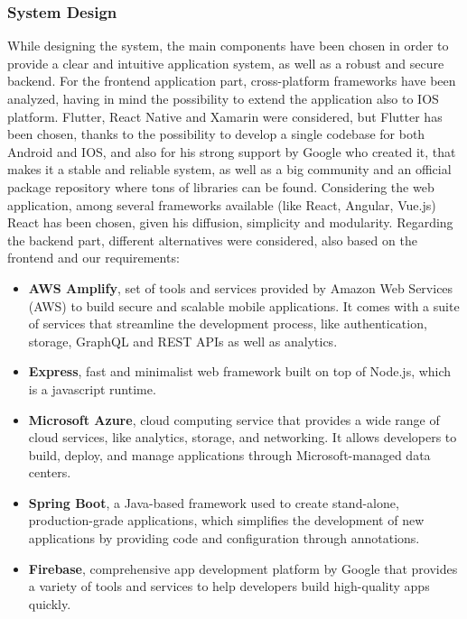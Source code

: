 \subsubsection{System Design}

While designing the system, the main components have been chosen in order to provide a clear and intuitive application system, as well as a robust and secure backend.
\newline For the frontend application part, cross-platform frameworks have been analyzed, having in mind the possibility to extend the application also to IOS platform. Flutter, React Native and Xamarin were considered, but Flutter has been chosen, thanks to the possibility to develop a single codebase for both Android and IOS, and also for his strong support by Google who created it, that makes it a stable and reliable system, as well as a big community and an official package repository where tons of libraries can be found. Considering the web application, among several frameworks available (like React, Angular, Vue.js) React has been chosen, given his diffusion, simplicity and modularity.   
\newline Regarding the backend part, different alternatives were considered, also based on the frontend and our requirements:
\begin{itemize}[nosep] %
    \item \textbf{AWS Amplify}, set of tools and services provided by Amazon Web Services (AWS) to build secure and scalable mobile applications. It comes with a suite of services that streamline the development process, like authentication, storage, GraphQL and REST APIs as well as analytics. 
    \item \textbf{Express}, fast and minimalist web framework built on top of Node.js, which is a javascript runtime.
    \item \textbf{Microsoft Azure}, cloud computing service that provides a wide range of cloud services, like analytics, storage, and networking. It allows developers to build, deploy, and manage applications through Microsoft-managed data centers.
    \item \textbf{Spring Boot}, a Java-based framework used to create stand-alone, production-grade applications, which simplifies the development of new applications by providing code and configuration through annotations.
    \item \textbf{Firebase}, comprehensive app development platform by Google that provides a variety of tools and services to help developers build high-quality apps quickly.
\end{itemize}
